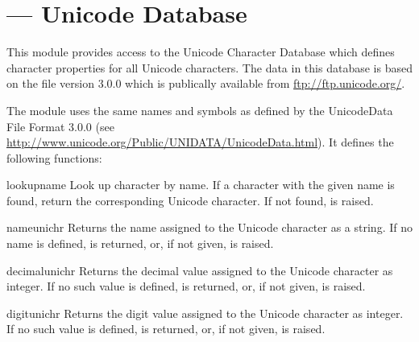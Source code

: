 \section{ ---
         Unicode Database}




This module provides access to the Unicode Character Database which
defines character properties for all Unicode characters. The data in
this database is based on the  file version
3.0.0 which is publically available from \url{ftp://ftp.unicode.org/}.

The module uses the same names and symbols as defined by the
UnicodeData File Format 3.0.0 (see
\url{http://www.unicode.org/Public/UNIDATA/UnicodeData.html}).  It
defines the following functions:

\begin{funcdesc}{lookup}{name}
  Look up character by name.  If a character with the
  given name is found, return the corresponding Unicode
  character.  If not found,  is raised.
\end{funcdesc}

\begin{funcdesc}{name}{unichr}
  Returns the name assigned to the Unicode character
   as a string. If no name is defined,
   is returned, or, if not given,
   is raised.
\end{funcdesc}

\begin{funcdesc}{decimal}{unichr}
  Returns the decimal value assigned to the Unicode character
   as integer. If no such value is defined,
   is returned, or, if not given,
   is raised.
\end{funcdesc}

\begin{funcdesc}{digit}{unichr}
  Returns the digit value assigned to the Unicode character
   as integer. If no such value is defined,
   is returned, or, if not given,
   is raised.
\end{funcdesc}

